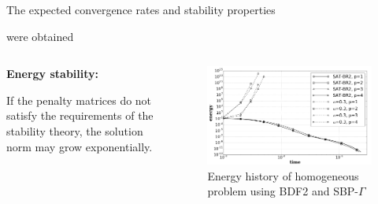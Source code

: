 \documentclass[final]{beamer}
\newlength{\thirdcolwid}
\begin{document}
\begin{frame}[t]
\begin{columns}[t]
\begin{column}{\thirdcolwid}
\begin{alertblock}{The expected convergence rates and stability properties 
        
        were obtained}
\begin{itemize}
    

    \begin{columns}[t] 
    \begin{column}{0.3\textwidth}
        \item \textbf{Energy stability:}
        
        If the penalty matrices do not satisfy the requirements of the stability theory, the solution norm may grow exponentially.
    \end{column}
    \begin{column}{0.625\textwidth}
        \begin{figure} 
            \includegraphics[width=0.92\linewidth]{figures/energy_stability.png}
            \caption*{Energy history of homogeneous problem using BDF2 and SBP-$\Gamma$}
        \end{figure}
    \end{column}
\end{columns}
\end{itemize}

\end{alertblock}
    

\end{column}
\end{columns}
\end{frame}
\end{document}

